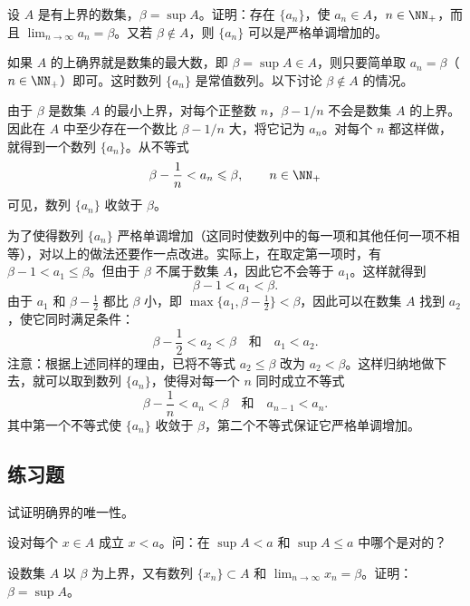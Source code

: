 \begin{xexample}[3.1.3]
设 $A$ 是有上界的数集，$\beta=\sup A$。证明：存在 $\{a_n\}$，使 $a_n\in A$，$n\in\NN_+$，而且 $\lim_{n\to\infty}a_n=\beta$。又若 $\beta\notin A$，则 $\{a_n\}$ 可以是严格单调增加的。
\end{xexample}
\begin{xproof}
如果 $A$ 的上确界就是数集的最大数，即 $\beta=\sup A\in A$，则只要简单取 $a_n=\beta$（$n\in\NN_+$）即可。这时数列 $\{a_n\}$ 是常值数列。以下讨论 $\beta\notin A$ 的情况。

由于 $\beta$ 是数集 $A$ 的最小上界，对每个正整数 $n$，$\beta-1/n$ 不会是数集 $A$ 的上界。因此在 $A$ 中至少存在一个数比 $\beta-1/n$ 大，将它记为 $a_n$。对每个 $n$ 都这样做，就得到一个数列 $\{a_n\}$。从不等式
\[
  \beta-\frac1n<a_n\leqslant\beta,\qquad n\in\NN_+
\]
可见，数列 $\{a_n\}$ 收敛于 $\beta$。

为了使得数列 $\{a_n\}$ 严格单调增加（这同时使数列中的每一项和其他任何一项不相等），对以上的做法还要作一点改进。实际上，在取定第一项时，有 $\beta-1<a_1\leqslant\beta$。但由于 $\beta$ 不属于数集 $A$，因此它不会等于 $a_1$。这样就得到
\[
  \beta-1<a_1<\beta.
\]
由于 $a_1$ 和 $\beta-\frac12$ 都比 $\beta$ 小，即 $\max\{a_1,\beta-\frac12\}<\beta$，因此可以在数集 $A$ 找到 $a_2$，使它同时满足条件：
\[
  \beta-\frac12<a_2<\beta\quad\text{和}\quad a_1<a_2.
\]
注意：根据上述同样的理由，已将不等式 $a_2\leqslant\beta$ 改为 $a_2<\beta$。这样归纳地做下去，就可以取到数列 $\{a_n\}$，使得对每一个 $n$ 同时成立不等式
\[
  \beta-\frac1n<a_n<\beta\quad\text{和}\quad a_{n-1}<a_n.
\]
其中第一个不等式使 $\{a_n\}$ 收敛于 $\beta$，第二个不等式保证它严格单调增加。
\end{xproof}

\subsection{练习题}

\begin{xexercise}[1]
试证明确界的唯一性。
\end{xexercise}

\begin{xexercise}[2]
设对每个 $x\in A$ 成立 $x<a$。问：在 $\sup A<a$ 和 $\sup A\leqslant a$ 中哪个是对的？
\end{xexercise}

\begin{xexercise}[3]
设数集 $A$ 以 $\beta$ 为上界，又有数列 $\{x_n\}\subset A$ 和 $\lim_{n\to\infty}x_n=\beta$。证明：$\beta=\sup A$。
\end{xexercise}

